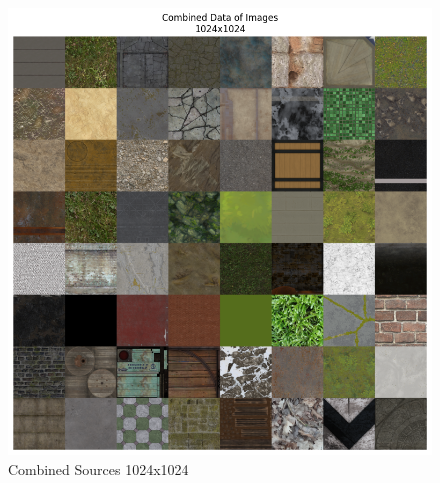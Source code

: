 \begin{figure}[h]
\begin{minipage}{.50\textwidth}
            \includegraphics[width=\linewidth]{../code/dataAnalysis/plots/exampleImgs/DataCombined1024x.png}
            \caption{Combined Sources 1024x1024}
            \label{fig:exmapleImgs1024}
        \end{minipage}
    \end{figure}

